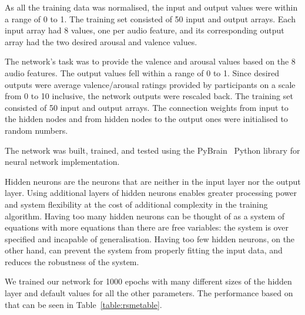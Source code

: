 As all the training data was normalised, the input and output values were within a range of 0 to 1. The training set consisted of 50 input and output arrays. Each input array had 8 values, one per audio feature, and its corresponding output array had the two desired arousal and valence values.

The network’s task was to provide the valence and arousal values based on the 8 audio features. The output values fell within a range of 0 to 1. Since desired outputs were average valence/arousal ratings provided by participants on a scale from 0 to 10 inclusive, the network outputs were rescaled back. The training set consisted of 50 input and output arrays. The connection weights from input to the hidden nodes and from hidden nodes to the output ones were initialised to random numbers. 

The network was built, trained, and tested using the PyBrain~\cite{pybrain} Python library for neural network implementation. 

Hidden neurons are the neurons that are neither in the input layer nor the output layer. Using additional layers of hidden neurons enables greater processing power and system flexibility at the cost of additional complexity in the training algorithm. Having too many hidden neurons can be thought of as a system of equations with more equations than there are free variables: the system is over specified and incapable of generalisation. Having too few hidden neurons, on the other hand, can prevent the system from properly fitting the input data, and reduces the robustness of the system.

We trained our network for 1000 epochs with many different sizes of the hidden layer and default values for all the other parameters. The performance based on that can be seen in Table~\ref{table:rsmetable}.


